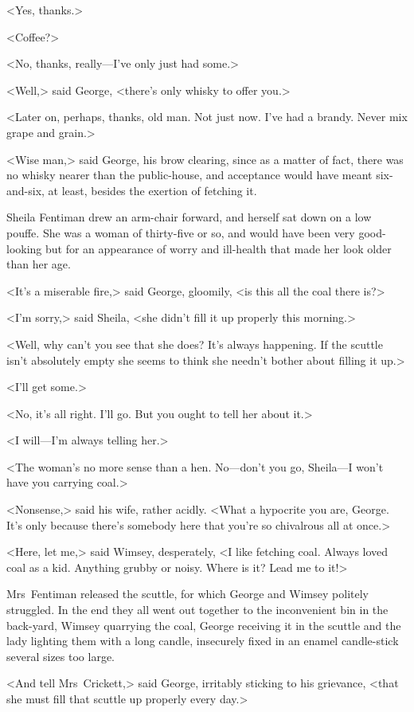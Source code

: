 <Yes, thanks.>

<Coffee?>

<No, thanks, really—I've only just had some.>

<Well,> said George, <there's only whisky to offer you.>

<Later on, perhaps, thanks, old man. Not just now. I've had a brandy. Never mix grape and grain.>

<Wise man,> said George, his brow clearing, since as a matter of fact, there was no whisky nearer than the public-house, and acceptance would have meant six-and-six, at least, besides the exertion of fetching it.

Sheila Fentiman drew an arm-chair forward, and herself sat down on a low pouffe. She was a woman of thirty-five or so, and would have been very good-looking but for an appearance of worry and ill-health that made her look older than her age.

<It's a miserable fire,> said George, gloomily, <is this all the coal there is?>

<I'm sorry,> said Sheila, <she didn't fill it up properly this morning.>

<Well, why can't you see that she does? It's always happening. If the scuttle isn't absolutely empty she seems to think she needn't bother about filling it up.>

<I'll get some.>

<No, it's all right. I'll go. But you ought to tell her about it.>

<I will—I'm always telling her.>

<The woman's no more sense than a hen. No—don't you go, Sheila—I won't have you carrying coal.>

<Nonsense,> said his wife, rather acidly. <What a hypocrite you are, George. It's only because there's somebody here that you're so chivalrous all at once.>

<Here, let me,> said Wimsey, desperately, <I like fetching coal. Always loved coal as a kid. Anything grubby or noisy. Where is it? Lead me to it!>

Mrs~Fentiman released the scuttle, for which George and Wimsey politely struggled. In the end they all went out together to the inconvenient bin in the back-yard, Wimsey quarrying the coal, George receiving it in the scuttle and the lady lighting them with a long candle, insecurely fixed in an enamel candle-stick several sizes too large.

<And tell Mrs~Crickett,> said George, irritably sticking to his grievance, <that she must fill that scuttle up properly every day.>

